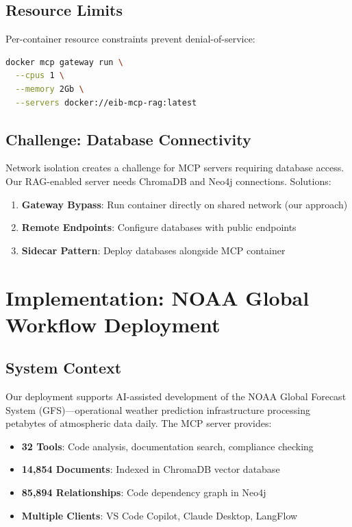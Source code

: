 \documentclass[11pt,letterpaper]{article}
\begin{document}
\subsection{Resource Limits}

Per-container resource constraints prevent denial-of-service:

\begin{lstlisting}[language=bash,caption={Resource Constraints}]
docker mcp gateway run \
  --cpus 1 \
  --memory 2Gb \
  --servers docker://eib-mcp-rag:latest
\end{lstlisting}

\subsection{Challenge: Database Connectivity}

Network isolation creates a challenge for MCP servers requiring database access. Our RAG-enabled server needs ChromaDB and Neo4j connections. Solutions:

\begin{enumerate}[noitemsep]
    \item \textbf{Gateway Bypass}: Run container directly on shared network (our approach)
    \item \textbf{Remote Endpoints}: Configure databases with public endpoints
    \item \textbf{Sidecar Pattern}: Deploy databases alongside MCP container
\end{enumerate}

\section{Implementation: NOAA Global Workflow Deployment}

\subsection{System Context}

Our deployment supports AI-assisted development of the NOAA Global Forecast System (GFS)---operational weather prediction infrastructure processing petabytes of atmospheric data daily. The MCP server provides:

\begin{itemize}[noitemsep]
    \item \textbf{32 Tools}: Code analysis, documentation search, compliance checking
    \item \textbf{14,854 Documents}: Indexed in ChromaDB vector database
    \item \textbf{85,894 Relationships}: Code dependency graph in Neo4j
    \item \textbf{Multiple Clients}: VS Code Copilot, Claude Desktop, LangFlow
\end{itemize}
\end{document}
